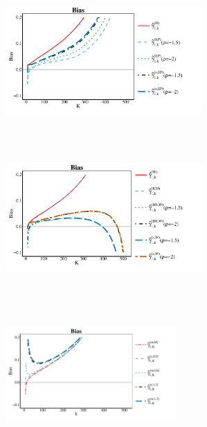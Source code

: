 \begin{landscape}
\begin{figure}[h]
	\centering
	\begin{subfigure}[h]{0.3\linewidth}
		\includegraphics[width=7.5cm,height=5.5cm]{./plots/paper2/Bias_simulations_B21_H.pdf}
	\end{subfigure}
	\hspace{\fill}
	\begin{subfigure}[h]{0.3\linewidth}
		\includegraphics[width=7.5cm,height=5.5cm]{./plots/paper2/Bias_simulations_B21_W.pdf}
	\end{subfigure}
	\hspace{\fill}
	\begin{subfigure}[h]{0.3\linewidth}
		\includegraphics[width=6.5cm,height=5.5cm]{./plots/paper2/Bias_simulations_B21_B.pdf}
	\end{subfigure}
	\hspace{\fill}
	\begin{subfigure}[h]{0.3\linewidth}

\end{subfigure}
\end{figure}
\end{landscape}
